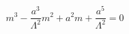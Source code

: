 \begin{equation} \label{17}
m^3-\frac{a^3}{\Lambda^2}m^2+a^2m+\frac{a^5}{\Lambda^2}=0
\end{equation}

